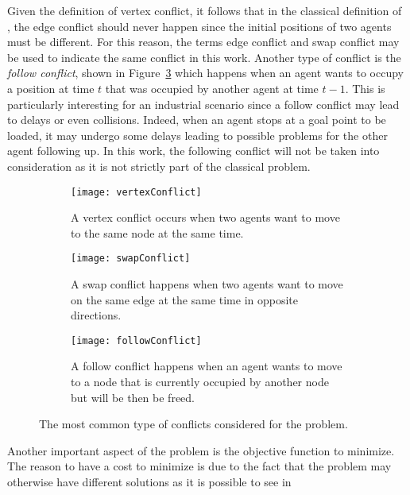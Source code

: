 Given the definition of vertex conflict, it follows that in the classical
definition of , the edge conflict should never happen since the 
initial positions of two agents must be different. For this reason, the terms 
edge conflict and swap conflict may be used to indicate the same conflict in 
this work. \newline
Another type of conflict is the \textit{follow conflict}, shown in
Figure~\ref{fig:followConflict} which happens when an agent wants to occupy a
position at time $t$ that was occupied by another agent at time $t-1$. This
is particularly interesting for an industrial scenario since a follow conflict
may lead to delays or even collisions. Indeed, when an agent stops at a goal
point to be loaded, it may undergo some delays leading to possible problems for
the other agent following up. In this work, the following conflict will not be
taken into consideration as it is not strictly part of the classical
 problem.
\begin{figure}[tb]
  \centering
  \begin{subfigure}[t]{0.3\linewidth}
    \centering
    \texttt{[image: vertexConflict]}
    \caption{A vertex conflict occurs when two agents want to move to the same
    node at the same time.}
    \label{fig:vertexConflict}
  \end{subfigure}
  \hfill{}
  \begin{subfigure}[t]{0.3\linewidth}
    \centering
    \texttt{[image: swapConflict]}
    \caption{A swap conflict happens when two agents want to move on the same
    edge at the same time in opposite directions.}
    \label{fig:swapConflict}
  \end{subfigure}
  \hfill{}
  \begin{subfigure}[t]{0.3\linewidth}
    \centering
    \texttt{[image: followConflict]}
    \caption{A follow conflict happens when an agent wants to move to a node
    that is currently occupied by another node but will be then be freed.}
    \label{fig:followConflict}
  \end{subfigure}
  \caption{The most common type of conflicts considered for the 
  problem.}
  \label{fig:conflicts}
\end{figure} \newline
Another important aspect of the  problem is the objective function
to minimize. The reason to have a cost to minimize is due to the fact that the
problem may otherwise have different solutions as it is possible to see in
